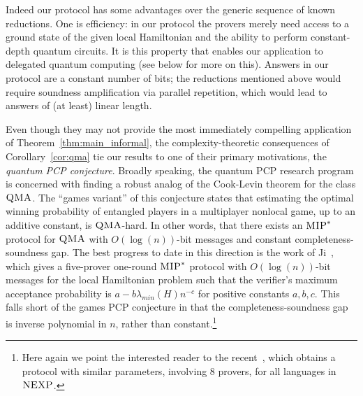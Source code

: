 \documentclass[11pt,letterpaper]{article}
\newcommand{\<}{\langle}
\renewcommand{\>}{\rangle}
\newcommand{\MIP}{\textsc{MIP}}
\newcommand{\QMA}{\textsc{QMA}}
\newcommand{\NEXP}{\textsc{NEXP}}
\begin{document}
Indeed our protocol has some advantages over the generic sequence of known reductions. One is efficiency: in our protocol the provers merely need
access to a ground state of the given local Hamiltonian and the
ability to perform constant-depth quantum circuits. It is this
property that enables our application to delegated quantum computing
(see below for more on this). Answers in our protocol are a constant number of bits; the reductions mentioned above would require soundness amplification via parallel repetition, which would lead to answers of (at least) linear length. 

Even though they may not provide the most immediately compelling application of
  Theorem~\ref{thm:main_informal}, the complexity-theoretic consequences of
  Corollary~\ref{cor:qma} tie our results to one
  of their primary motivations, the \emph{quantum PCP
    conjecture}. Broadly speaking, the quantum PCP research program is
  concerned with finding a robust analog of the Cook-Levin theorem for
  the class $\QMA$. The ``games variant'' of this conjecture states
  that estimating the optimal winning probability of entangled players
  in a multiplayer nonlocal game, up to an additive constant, is
  $\QMA$-hard. In other words, that there exists an $\MIP^*$ protocol
  for $\QMA$ with $O(\log(n))$-bit messages and constant
  completeness-soundness gap. The best progress to date in this
  direction is the work of Ji~\cite{ji2015classical}, which gives a
  five-prover one-round $\MIP^*$ protocol with $O(\log(n))$-bit
  messages for the local Hamiltonian problem such that the verifier's
  maximum acceptance probability is $a-b\lambda_{min}(H)n^{-c}$ for
  positive constants $a,b,c$. This falls short of the games PCP
  conjecture in that the completeness-soundness gap is inverse
  polynomial in $n$, rather than constant.\footnote{Here again we point the interested reader to the recent~\cite{ji16nexp}, which obtains a protocol with similar parameters, involving $8$ provers, for all languages in $\NEXP$.}
\end{document}
